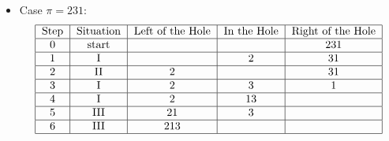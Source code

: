 \documentclass[10pt]{article}
\begin{document}
\begin{enumerate}
\begin{enumerate}
\begin{itemize}
\begin{itemize}
\begin{align*}
\begin{tabular}{|c|c|c|c|c|}
                             \hline
                             0& \text{start} &  &  & 213\\
                             \hline
                             1& \text{I} &  & 2 & 13\\
                             \hline
                             2& \text{II} & & 12 & 3\\
                             \hline
                             3& \text{II} & 1 & 2 & 3\\
                             \hline
                             4& \text{II} & 12 &  & \\
                             \hline
                             5& \text{I} & 12 & 3 & \\
                             \hline
                             6& \text{III} & 123 &  & \\
                             \hline
                        \end{tabular}
                    \end{align*}
                    \item Case $\pi = 231$:
                    \begin{align*}
                        \begin{tabular}{|c|c|c|c|c|}
                            \hline
                             \text{Step}& \text{Situation} & \text{Left of the Hole} & \text{In the Hole} & \text{Right of the Hole}\\
                             \hline
                             0& \text{start} &  &  & 231\\
                             \hline
                             1& \text{I} &  & 2 & 31\\
                             \hline
                             2& \text{II} &2 &  & 31\\
                             \hline
                             3& \text{I} & 2 & 3 & 1\\
                             \hline
                             4& \text{I} & 2 & 13  & \\
                             \hline
                             5& \text{III} & 21 & 3 & \\
                             \hline
                             6& \text{III} & 213 &  & \\
                             \hline
                        \end{tabular}

\end{align*}
\end{itemize}
\end{itemize}
\end{enumerate}
\end{enumerate}
\end{document}

